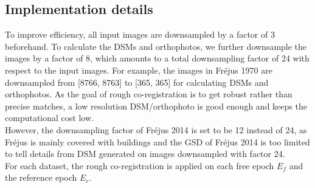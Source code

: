 \subsection{Implementation details}
\label{Implementationdetails}
To improve efficiency, all input images are downsampled by a factor of 3 beforehand. To calculate the DSMs and orthophotos, we further downsample the images by a factor of 8, which amounts to a total downsampling factor of 24 with respect to the input images. For example, the images in Fr{\'e}jus 1970 are downsampled from [8766, 8763] to [365, 365] for calculating DSMs and orthophotos. As the goal of rough co-registration is to get robust rather than precise matches, a low resolution DSM/orthophoto is good enough and keeps the computational cost low. \\
However, the downsampling factor of Fr{\'e}jus 2014 is set to be 12 instead of 24, as Fr{\'e}jus is mainly covered with buildings and the GSD of Fr{\'e}jus 2014 is too limited to tell details from DSM generated on images downsampled with factor 24.\\
For each dataset, the rough co-registration is applied on each free epoch $E_f$ and the reference epoch $E_r$.
\par

